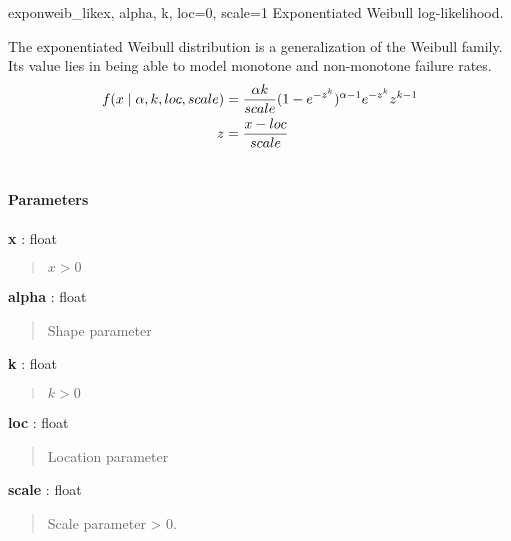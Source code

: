 \hypertarget{pymc.distributions.exponweib_like}{}
\begin{funcdesc}{exponweib\_like}{x, alpha, k, loc=0, scale=1}
Exponentiated Weibull log-likelihood.

The exponentiated Weibull distribution is a generalization of the Weibull
family. Its value lies in being able to model monotone and non-monotone
failure rates.
\begin{gather}
\begin{split}f(x \mid \alpha,k,loc,scale)  & = \frac{\alpha k}{scale} (1-e^{-z^k})^{\alpha-1} e^{-z^k} z^{k-1} \\
z & = \frac{x-loc}{scale}\end{split}\notag\\\begin{split}\end{split}\notag
\end{gather}\paragraph{Parameters}
\begin{paramlist}
\item[] \textbf{x} : float
\begin{quote}

$x>0$
\end{quote}

\item[] \textbf{alpha} : float
\begin{quote}

Shape parameter
\end{quote}

\item[] \textbf{k} : float
\begin{quote}

$k>0$
\end{quote}

\item[] \textbf{loc} : float
\begin{quote}

Location parameter
\end{quote}

\item[] \textbf{scale} : float
\begin{quote}

Scale parameter \textgreater{} 0.
\end{quote}
\end{paramlist}
\end{funcdesc}

